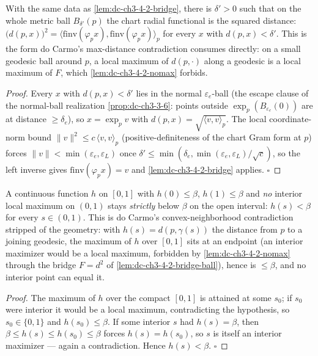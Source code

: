 \begin{lemma}
  \label{lem:dc-ch3-4-2-bridge-ball}
  \leanok
  With the same data as \cref{lem:dc-ch3-4-2-bridge}, there is $\delta'>0$ such that on the whole
  metric ball $B_{\delta'}(p)$ the chart radial functional is the squared distance:
  $\big(d(p,x)\big)^2 = \langle \mathrm{finv}(\varphi_p x), \mathrm{finv}(\varphi_p x)\rangle_p$ for
  every $x$ with $d(p,x)<\delta'$. This is the form do Carmo's max-distance contradiction consumes
  directly: on a small geodesic ball around $p$, a local maximum of $d(p,\cdot)$ along a geodesic is
  a local maximum of $F$, which \cref{lem:dc-ch3-4-2-nomax} forbids.
\end{lemma}
\begin{proof}
  \leanok
  Every $x$ with $d(p,x)<\delta'$ lies in the normal $\varepsilon_e$-ball (the escape clause of the
  normal-ball realization \cref{prop:dc-ch3-3-6}: points outside $\exp_p(B_{\varepsilon_e}(0))$ are at
  distance $\ge\delta_e$), so $x=\exp_p v$ with $d(p,x)=\sqrt{\langle v,v\rangle_p}$. The local
  coordinate-norm bound $\|v\|^2\le c\,\langle v,v\rangle_p$ (positive-definiteness of the chart Gram
  form at $p$) forces $\|v\|<\min(\varepsilon_e,\varepsilon_L)$ once
  $\delta'\le\min(\delta_e,\min(\varepsilon_e,\varepsilon_L)/\sqrt c)$, so the left inverse gives
  $\mathrm{finv}(\varphi_p x)=v$ and \cref{lem:dc-ch3-4-2-bridge} applies. $\square$
\end{proof}

\begin{lemma}
  \label{lem:dc-ch3-4-2-maxdeduction}
  \leanok
  A continuous function $h$ on $[0,1]$ with $h(0)\le\beta$, $h(1)\le\beta$ and \emph{no} interior
  local maximum on $(0,1)$ stays \emph{strictly} below $\beta$ on the open interval: $h(s)<\beta$ for
  every $s\in(0,1)$. This is do Carmo's convex-neighborhood contradiction stripped of the geometry:
  with $h(s)=d(p,\gamma(s))$ the distance from $p$ to a joining geodesic, the maximum of $h$ over
  $[0,1]$ sits at an endpoint (an interior maximizer would be a local maximum, forbidden by
  \cref{lem:dc-ch3-4-2-nomax} through the bridge $F=d^2$ of \cref{lem:dc-ch3-4-2-bridge-ball}), hence
  is $\le\beta$, and no interior point can equal it.
\end{lemma}
\begin{proof}
  \leanok
  The maximum of $h$ over the compact $[0,1]$ is attained at some $s_0$; if $s_0$ were interior it
  would be a local maximum, contradicting the hypothesis, so $s_0\in\{0,1\}$ and $h(s_0)\le\beta$.
  If some interior $s$ had $h(s)=\beta$, then $\beta\le h(s)\le h(s_0)\le\beta$ forces $h(s)=h(s_0)$,
  so $s$ is itself an interior maximizer — again a contradiction. Hence $h(s)<\beta$. $\square$
\end{proof}

